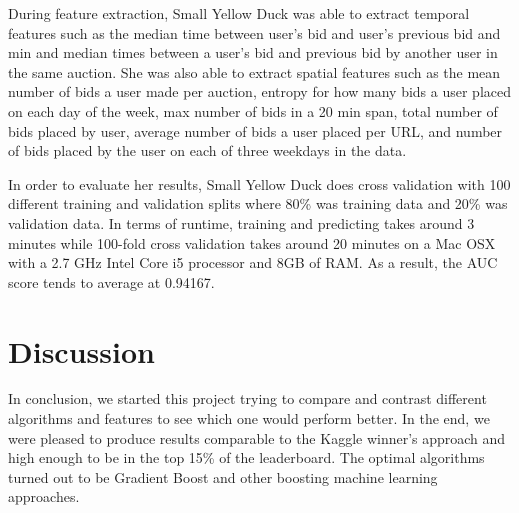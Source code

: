\documentclass{article} %
\begin{document}
During feature extraction, Small Yellow Duck was able to extract temporal features such as the median time between user's bid and user's previous bid and min and median times between a user's bid and previous bid by another user in the same auction. She was also able to extract spatial features such as the mean number of bids a user made per auction, entropy for how many bids a user placed on each day of the week, max number of bids in a 20 min span, total number of bids placed by user, average number of bids a user placed per URL, and number of bids placed by the user on each of three weekdays in the data.

In order to evaluate her results, Small Yellow Duck does cross validation with 100 different training and validation splits where 80\% was training data and 20\% was validation data.
In terms of runtime, training and predicting takes around 3 minutes while 100-fold cross validation takes around 20 minutes on a Mac OSX with a 2.7 GHz Intel Core i5 processor and 8GB of RAM.
As a result, the AUC score tends to average at 0.94167. 

\section{Discussion}
In conclusion, we started this project trying to compare and contrast different algorithms and features to see which one would perform better. In the end, we were pleased to produce results comparable to the Kaggle winner's approach and high enough to be in the top 15\% of the leaderboard. The optimal algorithms turned out to be Gradient Boost and other boosting machine learning approaches. \\
\end{document}
